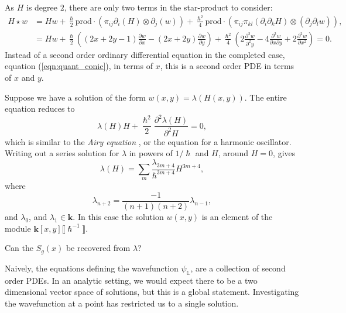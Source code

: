     As \(H\) is degree \(2\), there are only two terms in the star-product to consider:
    \begin{align*}
        H \star w &= H w + \frac{\hslash}{2} \mathrm{prod} \cdot (\pi_{ij} \partial_i ( H ) \otimes \partial_j (w) ) + \frac{\hslash^2}{4} \mathrm{prod} \cdot ( \pi_{ij} \pi_{kl} (\partial_i \partial_k H) \otimes (\partial_{j} \partial_{l} w )), \\
        &= H w +\frac{\hslash }{2}  \left((2 x+2 y-1)  \frac{\partial w}{\partial x}-(2 x+2 y) \frac{\partial w}{\partial y} \right) +  \frac{\hslash^2 }{4} \left(2 \frac{\partial^2 w}{\partial^2 y}-4 \frac{\partial^2 w}{\partial x \partial y}+2 \frac{\partial^2 w}{\partial x^2}\right)=0.
    \end{align*}
    Instead of a second order ordinary differential equation in the completed case, equation (\ref{eqn:quant_conic}), in terms of \(x\), this is a second order PDE in terms of \(x\) and \(y\). 

    Suppose we have a solution of the form \(w(x,y)= \lambda(H(x,y))\). The entire equation reduces to
    \[ \lambda(H) H + \frac{\hslash^2}{2} \frac{\partial^2 \lambda(H)}{\partial^2 H } = 0,\]
    which is similar to the \emph{Airy equation} \cite{airy}, or the equation for a harmonic oscillator.  Writing out a series solution for \( \lambda\) in powers of \( 1/\hslash\) and \(H\), around \(H=0\), gives
    \[ \lambda(H) = \sum_m \frac{\lambda_{3m+4} }{\hslash^{3m+4}} H^{3m+4},\]
    where
    \[ \lambda_{n+2} = \frac{-1}{(n+1)(n+2)} \lambda_{n-1},\]
    and \( \lambda_0\), and \( \lambda_1 \in \mathbf{k}\). In this case the solution \(w(x,y)\) is an element of the module \( \mathbf{k}[x,y]\lBrack\hslash^{-1} \rBrack\). 
    \begin{ques} 
    Can the \(S_g(x)\) be recovered from \( \lambda\)?
    \end{ques}

    
    \begin{rem}
    Naively, the equations defining the wavefunction \( \psi_{\mathbb{L}}\), are a collection of second order PDEs. In an analytic setting, we would expect there to be a two dimensional vector space of solutions, but this is a global statement. Investigating the wavefunction at a point has restricted us to a single solution.
    \end{rem}
    
